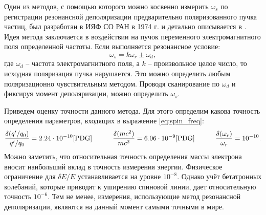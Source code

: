 \par Один из методов, с помощью которого можно косвенно измерить  $\omega_s$ по регистрации резонансной деполяризации предварительно поляризованного пучка частиц, был разработан в ИЯФ СО РАН в 1974 г. и детально описывается в \cite{MRD}. Идея метода заключается в воздействии на пучок переменного электромагнитного поля определенной частоты. Если выполняется резонансное условие:
\begin{equation}
\omega_s=  k\omega_{r} \pm \omega_d,
\end{equation}
где $\omega_d$ -- частота электромагнитного поля, а $k$ -- произвольное целое число,  то исходная поляризация пучка нарушается. Это можно определить любым поляризационно чувствительным методом. Проводя сканирование по $\omega_d$ и фиксируя момент деполяризации, можно определить $\omega_s$.
\par Приведем оценку точности данного метода. Для этого определим какова точность определения параметров, входящих в выражение \ref{eq:spin_freq}:
\[
	\begin{matrix}
	  \displaystyle \frac{\delta (q'/q_0)}{q'/q_0} = 2.24 \cdot 10^{-10}\cite{PDG}\qquad
	& \displaystyle \frac{\delta (mc^2)}{mc^2}= 6.06\cdot10^{-9}\cite{PDG}\qquad
	& \displaystyle \frac{\delta (\omega_r)}{\omega_r} = 10^{-10}.
	\end{matrix}
\]
\noindent Можно заметить, что относительная точность определения массы электрона вносит наибольший вклад в точность измерения энергии. Физическое ограничение для $\delta E/E$ устанавливается на уровне $10^{-8}$. Однако учёт бетатронных колебаний, которые приводят к уширению спиновой линии, дает относительную точность $10^{-6}$. Тем не менее, измерения, использующие метод резонансной деполяризации, являются на данный момент самыми точными в мире.
